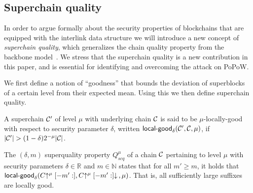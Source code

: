 %




\subsection{Superchain quality}
In order to argue formally about the security
properties of blockchains that are equipped with the interlink
data structure we will introduce a new concept of {\em superchain quality},
which generalizes the chain quality property from the backbone model~\cite{backbone}.
We stress that the superchain quality is a new contribution in this paper, and is essential for identifying and overcoming the attack on PoPoW.

We first define a notion of ``goodness'' that bounds the deviation
of superblocks of a certain level from their expected mean. Using
this we then define superchain quality.

\begin{definition}
A superchain $\mathcal{C}'$ of level
$\mu$ with underlying chain $\mathcal{C}$ is said to be $\mu$-\textnormal{locally-good}
with respect to security parameter $\delta$, written
$\textsf{local-good}_{\delta}(\mathcal{C}', \mathcal{C}, \mu)$, if $|\mathcal{C}'| > (1 -
\delta)2^{-\mu}|\mathcal{C}|$.
\end{definition}

\begin{definition}
The $(\delta, m)$ superquality property $Q^\mu_{scq}$ of a chain $\mathcal{C}$
pertaining to level $\mu$ with security parameters $\delta \in \mathbb{R}$ and
$m \in \mathbb{N}$ states that for all $m' \geq m$, it holds that
$\textsf{local-good}_{\delta}(C\negthickspace\uparrow^\mu[-m':],
C\negthickspace\uparrow^\mu[-m':]\negthickspace\downarrow\,, \mu)$. That is, all sufficiently large suffixes
are locally good.
\end{definition}

